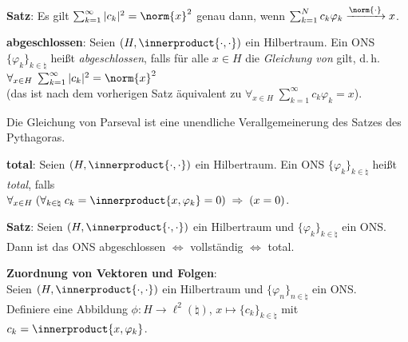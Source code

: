 \textbf{Satz}:
Es gilt $\sum_{k=1}^\infty |c_k|^2 = \norm{x}^2$ genau dann, wenn
$\sum_{k=1}^N c_k \varphi_k \xrightarrow{\norm{\cdot}} x$.

\textbf{abgeschlossen}:
Seien $(H, \innerproduct{\cdot, \cdot})$ ein Hilbertraum.
Ein ONS $\{\varphi_k\}_{k \in \natural}$ heißt \emph{abgeschlossen}, falls
für alle $x \in H$ die \emph{Gleichung von } gilt, d.\,h.
$\forall_{x \in H}\; \sum_{k=1}^\infty |c_k|^2 = \norm{x}^2$\\
(das ist nach dem vorherigen Satz äquivalent zu
$\forall_{x \in H}\; \sum_{k=1}^\infty c_k \varphi_k = x$).

Die Gleichung von Parseval ist eine unendliche Verallgemeinerung des
Satzes des Pythagoras.

\textbf{total}:
Seien $(H, \innerproduct{\cdot, \cdot})$ ein Hilbertraum.
Ein ONS $\{\varphi_k\}_{k \in \natural}$ heißt \emph{total}, falls\\
$\forall_{x \in H}\; (\forall_{k \in \natural}\;
c_k = \innerproduct{x, \varphi_k} = 0) \;\Rightarrow\; (x = 0)$.

\textbf{Satz}:
Seien $(H, \innerproduct{\cdot, \cdot})$ ein Hilbertraum und
$\{\varphi_k\}_{k \in \natural}$ ein ONS.\\
Dann ist das ONS abgeschlossen $\iff$ vollständig $\iff$ total.

\linie
\pagebreak

\textbf{Zuordnung von Vektoren und Folgen}:\\
Seien $(H, \innerproduct{\cdot, \cdot})$ ein Hilbertraum und
$\{\varphi_n\}_{n \in \natural}$ ein ONS.\\
Definiere eine Abbildung $\phi\colon H \rightarrow \ell^2(\natural)$,
$x \mapsto \{c_k\}_{k \in \natural}$ mit $c_k = \innerproduct{x, \varphi_k}$.

